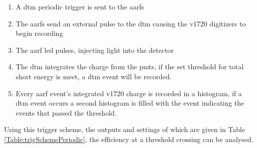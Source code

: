 \begin{enumerate}
\item A \gls{dtm} periodic trigger is sent to the \gls{aarf}s
\item The \gls{aarf}s send an external pulse to the \gls{dtm} causing the \gls{v1720} digitizers to begin recording
\item The \gls{aarf} \gls{led} pulses, injecting light into the detector
\item The \gls{dtm} integrates the charge from the \gls{pmt}s, if the set threshold for total short energy is meet, a \gls{dtm} event will be recorded.
\item Every \gls{aarf} event's integrated \gls{v1720} charge is recorded in a histogram, if a \gls{dtm} event occurs a second histogram is filled with the event indicating the events that passed the threshold.
\end{enumerate}
Using this trigger scheme, the outputs and settings of which are given in Table \ref{Table:trigSchemePeriodic}, the efficiency at a threshold crossing can be analysed.



